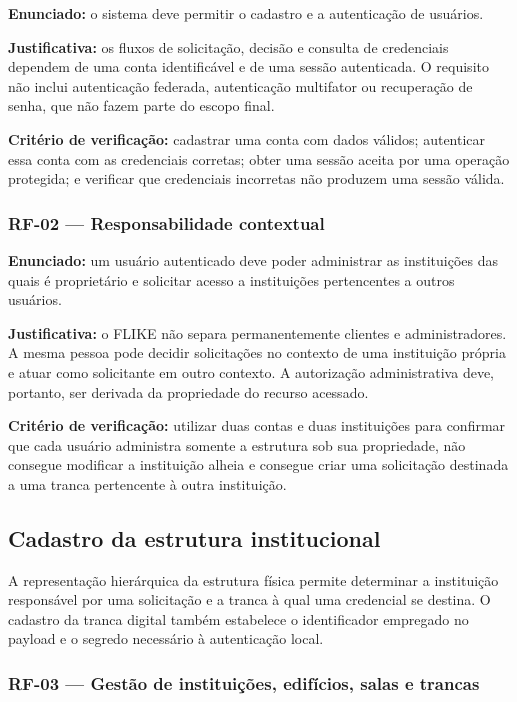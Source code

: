 \textbf{Enunciado:} o sistema deve permitir o cadastro e a autenticação de usuários.

\textbf{Justificativa:} os fluxos de solicitação, decisão e consulta de credenciais dependem de uma conta identificável e de uma sessão autenticada. O requisito não inclui autenticação federada, autenticação multifator ou recuperação de senha, que não fazem parte do escopo final.

\textbf{Critério de verificação:} cadastrar uma conta com dados válidos; autenticar essa conta com as credenciais corretas; obter uma sessão aceita por uma operação protegida; e verificar que credenciais incorretas não produzem uma sessão válida.

\subsubsection*{RF-02 --- Responsabilidade contextual}

\textbf{Enunciado:} um usuário autenticado deve poder administrar as instituições das quais é proprietário e solicitar acesso a instituições pertencentes a outros usuários.

\textbf{Justificativa:} o FLIKE não separa permanentemente clientes e administradores. A mesma pessoa pode decidir solicitações no contexto de uma instituição própria e atuar como solicitante em outro contexto. A autorização administrativa deve, portanto, ser derivada da propriedade do recurso acessado.

\textbf{Critério de verificação:} utilizar duas contas e duas instituições para confirmar que cada usuário administra somente a estrutura sob sua propriedade, não consegue modificar a instituição alheia e consegue criar uma solicitação destinada a uma tranca pertencente à outra instituição.

\subsection{Cadastro da estrutura institucional}

A representação hierárquica da estrutura física permite determinar a instituição responsável por uma solicitação e a tranca à qual uma credencial se destina. O cadastro da tranca digital também estabelece o identificador empregado no payload e o segredo necessário à autenticação local.

\subsubsection*{RF-03 --- Gestão de instituições, edifícios, salas e trancas}

